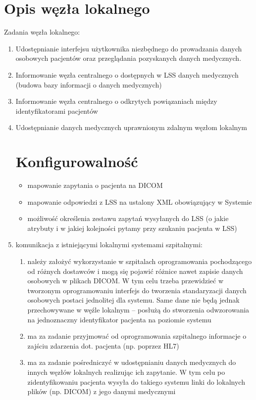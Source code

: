 \documentclass[a4paper]{report}
\begin{document}
\section{Opis węzła lokalnego}
Zadania węzła lokalnego:
\begin{enumerate}
\item Udostępnianie interfejsu użytkownika niezbędnego do prowadzania danych osobowych pacjentów
      oraz przeglądania pozyskanych danych medycznych.
\item Informowanie węzła centralnego o dostępnych w LSS danych medycznych (budowa bazy informacji o danych medycznych)
\item Informowanie węzła centralnego o odkrytych powiązaniach między identyfikatorami pacjentów
\item Udostępnianie danych medycznych uprawnionym zdalnym węzłom lokalnym

\section{Konfigurowalność}

\begin{itemize}
  \item mapowanie zapytania o pacjenta na DICOM
  \item mapowanie odpowiedzi z LSS na ustalony XML obowiązujący w Systemie
  \item możliwość określenia zestawu zapytań wysyłanych do LSS (o jakie atrybuty i w jakiej kolejności
  pytamy przy szukaniu pacjenta w LSS)
\end{itemize}


\item komunikacja z istniejącymi lokalnymi systemami szpitalnymi:
  \begin{enumerate}
  \item należy założyć wykorzystanie w szpitalach oprogramowania pochodzącego od różnych dostawców i mogą
        się pojawić różnice nawet zapisie danych osobowych w plikach DICOM. W tym celu trzeba przewidzieć
        w tworzonym oprogramowaniu interfejs do tworzenia standaryzacji danych osobowych postaci jednolitej
        dla systemu. Same dane nie będą jednak przechowywane w węźle lokalnym – posłużą do stworzenia odwzorowania
        na jednoznaczny identyfikator pacjenta na poziomie systemu
  \item ma za zadanie przyjmować od oprogramowania szpitalnego informacje o zajściu zdarzenia dot.
        pacjenta (np. poprzez HL7)
  \item ma za zadanie pośredniczyć w udostępnianiu danych medycznych do innych węzłów lokalnych realizując
        ich zapytanie. W tym celu po zidentyfikowaniu pacjenta wysyła do takiego systemu linki do lokalnych
        plików (np. DICOM) z jego danymi medycznymi
  \end{enumerate}


\end{enumerate}
\end{document}
